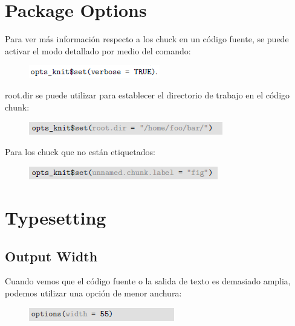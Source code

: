 \documentclass[10pt]{article}   			%
\begin{document}
\newpage
\section{Package Options}

Para ver más información respecto a los chuck en un código fuente, se puede activar el modo detallado por medio del comando:

\begin{figure}[ht] 
	\centering
		\includegraphics[scale=1.8]{Package1}
		\label{fig:Package1}
\end{figure}

root.dir se puede utilizar para establecer el directorio de trabajo en el código chunk:

\begin{figure}[ht] 
	\centering
		\includegraphics[scale=1.3]{Package2} 
		\label{fig:Package2}
\end{figure}

Para los chuck que no están etiquetados:

\begin{figure}[ht] 
	\centering
		\includegraphics[scale=1.3]{Package3} 
		\label{fig:Package3}
\end{figure}
	
\newpage	
\section{Typesetting}	

\subsection{Output Width}

Cuando vemos que el código fuente o la salida de texto es demasiado amplia, podemos utilizar una opción de menor anchura:

\begin{figure}[ht] 
	\centering
		\includegraphics[scale=1.8]{Width1}
		\label{fig:Width1}
\end{figure}
\end{document}
